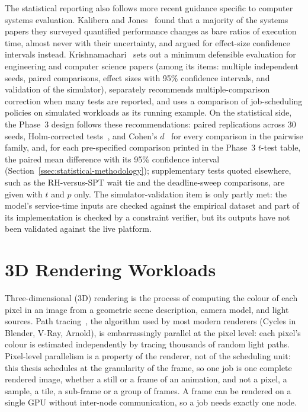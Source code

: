 The statistical reporting also follows more recent guidance specific to computer systems evaluation. Kalibera and Jones~\cite{kalibera2020quantifying} found that a majority of the systems papers they surveyed quantified performance changes as bare ratios of execution time, almost never with their uncertainty, and argued for effect-size confidence intervals instead. Krishnamachari~\cite{krishnamachari2026statistical} sets out a minimum defensible evaluation for engineering and computer science papers (among its items: multiple independent seeds, paired comparisons, effect sizes with 95\% confidence intervals, and validation of the simulator), separately recommends multiple-comparison correction when many tests are reported, and uses a comparison of job-scheduling policies on simulated workloads as its running example. On the statistical side, the Phase~3 design follows these recommendations: paired replications across 30 seeds, Holm-corrected tests~\cite{holm1979simple}, and Cohen's $d$~\cite{cohen1988statistical} for every comparison in the pairwise family, and, for each pre-specified comparison printed in the Phase~3 $t$-test table, the paired mean difference with its 95\% confidence interval (Section~\ref{ssec:statistical-methodology}); supplementary tests quoted elsewhere, such as the RH-versus-SPT wait tie and the deadline-sweep comparisons, are given with $t$ and $p$ only. The simulator-validation item is only partly met: the model's service-time inputs are checked against the empirical dataset and part of its implementation is checked by a constraint verifier, but its outputs have not been validated against the live platform.

\section{3D Rendering Workloads}
\label{sec:3d-rendering-workloads}

Three-dimensional (3D) rendering is the process of computing the colour of each pixel in an image from a geometric scene description, camera model, and light sources. Path tracing~\cite{pharr2023physically}, the algorithm used by most modern renderers (Cycles in Blender, V-Ray, Arnold), is embarrassingly parallel at the pixel level: each pixel's colour is estimated independently by tracing thousands of random light paths. Pixel-level parallelism is a property of the renderer, not of the scheduling unit: this thesis schedules at the granularity of the frame, so one job is one complete rendered image, whether a still or a frame of an animation, and not a pixel, a sample, a tile, a sub-frame or a group of frames. A frame can be rendered on a single GPU without inter-node communication, so a job needs exactly one node.

